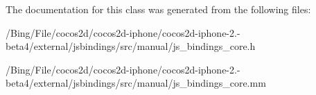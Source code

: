 The documentation for this class was generated from the following files\-:\begin{DoxyCompactItemize}
\item 
/\-Bing/\-File/cocos2d/cocos2d-\/iphone/cocos2d-\/iphone-\/2.-\/beta4/external/jsbindings/src/manual/js\-\_\-bindings\-\_\-core.\-h\item 
/\-Bing/\-File/cocos2d/cocos2d-\/iphone/cocos2d-\/iphone-\/2.-\/beta4/external/jsbindings/src/manual/js\-\_\-bindings\-\_\-core.\-mm\end{DoxyCompactItemize}
